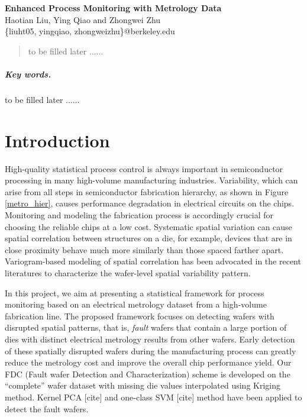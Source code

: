 \documentclass[12pt]{article}
\numberwithin{equation}{section}
\numberwithin{table}{section}
\numberwithin{figure}{section}
\begin{document}

\begin{center}
\textbf{\Large Enhanced Process Monitoring with Metrology Data} \\[6pt]
  Haotian Liu, Ying Qiao and Zhongwei Zhu \\[6pt]
  \{liuht05, yingqiao, zhongweizhu\}@berkeley.edu
\end{center}

\begin{abstract}
to be filled later ......
\end{abstract}

\subparagraph{Key words.} to be filled later ......


\section{Introduction}

\hspace{12 pt}
High-quality statistical process control is always important in
semiconductor processing in many high-volume manufacturing
industries\cite{DAC09}. Variability, which can arise from all steps in
semiconductor fabrication hierarchy, as shown in Figure \ref{metro_hier},
causes performance degradation 
in electrical circuits on the chips. Monitoring and modeling the
fabrication process is accordingly crucial for choosing the reliable 
chips at a low cost. Systematic spatial variation can cause spatial
correlation between structures on a die, for example, devices that are
in close proximity behave much more similarly than those spaced
farther apart\cite{KedarPHD}. Variogram-based modeling of spatial
correlation has been advocated in the recent literatures to
characterize the wafer-level spatial variability pattern. 


In this project, we aim at presenting a statistical framework for 
process monitoring based on an electrical metrology dataset from a
high-volume fabrication line. The proposed framework focuses on 
detecting wafers with disrupted spatial patterns, that is,
\emph{fault} wafers that contain a large portion of dies with distinct
electrical metrology results from other wafers. Early detection of
these spatially disrupted wafers during the manufacturing process can
greatly reduce the metrology cost and improve the overall chip performance yield.
Our FDC (Fault wafer Detection and Characterization) scheme is developed on the
``complete'' wafer dataset with missing die values interpolated using Kriging
method\cite{Cressie93}. Kernel PCA [cite] and one-class SVM [cite] method have
been applied to detect the fault wafers.   
\end{document}
